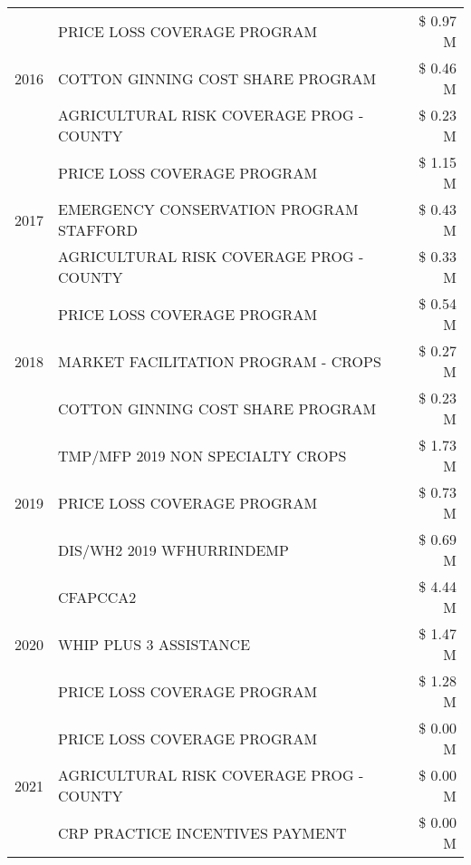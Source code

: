 \begin{tabular}{llr}
\cline{1-3}
\multirow[t]{3}{*}{2016} & PRICE LOSS COVERAGE PROGRAM                   & \$ 0.97 M \\
 & COTTON GINNING COST SHARE PROGRAM             & \$ 0.46 M \\
 & AGRICULTURAL RISK COVERAGE PROG - COUNTY      & \$ 0.23 M \\
\cline{1-3}
\multirow[t]{3}{*}{2017} & PRICE LOSS COVERAGE PROGRAM & \$ 1.15 M \\
 & EMERGENCY CONSERVATION PROGRAM STAFFORD & \$ 0.43 M \\
 & AGRICULTURAL RISK COVERAGE PROG - COUNTY & \$ 0.33 M \\
\cline{1-3}
\multirow[t]{3}{*}{2018} & PRICE LOSS COVERAGE PROGRAM & \$ 0.54 M \\
 & MARKET FACILITATION PROGRAM - CROPS & \$ 0.27 M \\
 & COTTON GINNING COST SHARE PROGRAM & \$ 0.23 M \\
\cline{1-3}
\multirow[t]{3}{*}{2019} & TMP/MFP 2019 NON SPECIALTY CROPS & \$ 1.73 M \\
 & PRICE LOSS COVERAGE PROGRAM & \$ 0.73 M \\
 & DIS/WH2 2019 WFHURRINDEMP & \$ 0.69 M \\
\cline{1-3}
\multirow[t]{3}{*}{2020} & CFAPCCA2 & \$ 4.44 M \\
 & WHIP PLUS 3 ASSISTANCE & \$ 1.47 M \\
 & PRICE LOSS COVERAGE PROGRAM & \$ 1.28 M \\
\cline{1-3}
\multirow[t]{3}{*}{2021} & PRICE LOSS COVERAGE PROGRAM & \$ 0.00 M \\
 & AGRICULTURAL RISK COVERAGE PROG - COUNTY & \$ 0.00 M \\
 & CRP PRACTICE INCENTIVES PAYMENT & \$ 0.00 M \\
\cline{1-3}
\bottomrule
\end{tabular}
